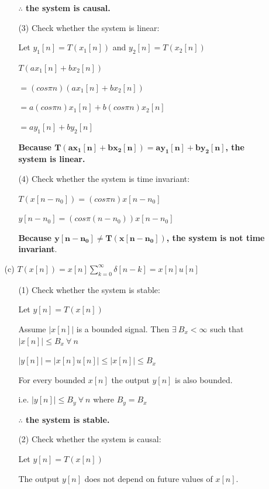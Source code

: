 \documentclass[fleqn]{article}
\begin{document}
\begin{enumerate}[nolistsep]
\begin{enumerate}[nolistsep]
\begin{enumerate}[nolistsep]
					\textbf{$\mathbf{\therefore}$ the system is causal.}
					
					\item[(3)] Check whether the system is linear:
					
					Let $y_1[n] = T(x_1[n])$ and $y_2[n] = T(x_2[n])$
					
					$T(ax_1[n] + bx_2[n])$
					
					$ = (cos{\pi}n)(ax_1[n] + bx_2[n])$
					
					$ = a(cos{\pi}n)x_1[n] + b(cos{\pi}n)x_2[n]$
					
					$ = ay_1[n] + by_2[n]$
					
					\textbf{Because $\mathbf{T(ax_1[n] + bx_2[n]) = ay_1[n] + by_2[n]}$, the system is linear.}
					
					\item[(4)] Check whether the system is time invariant:
					
					$T(x[n-n_0]) = (cos{\pi}n)x[n-n_0]$
					
					$y[n-n_0] = (cos{\pi}(n-n_0))x[n-n_0]$
					
					\textbf{Because $\mathbf{y[n-n_0] \neq T(x[n-n_0])}$, the system is not time invariant}.
				\end{enumerate}
					
				\item[(c)] $T(x[n]) = x[n]\sum_{k=0}^{\infty}{\delta[n-k]} = x[n]u[n]$
					
				\begin{enumerate}[nolistsep]
					\item[(1)] Check whether the system is stable:
			
					Let $y[n] = T(x[n])$
			
					Assume $|x[n]|$ is a bounded signal. Then $\exists\ B_x < \infty$ such that  $|x[n]| \leq B_x\ \forall\ n$
			
					$|y[n]| = |x[n]u[n]| \leq |x[n]| \leq B_x$
			
					For every bounded $x[n]$ the output $y[n]$ is also bounded.
			
					i.e. $|y[n]| \leq B_y\ \forall\ n$ where $B_y = B_x$
					
					\textbf{$\mathbf{\therefore}$ the system is stable.}
					
					\item[(2)] Check whether the system is causal:
					
					Let $y[n] = T(x[n])$
					
					The output $y[n]$ does not depend on future values of $x[n]$.
					

\end{enumerate}
\end{enumerate}
\end{enumerate}
\end{document}
